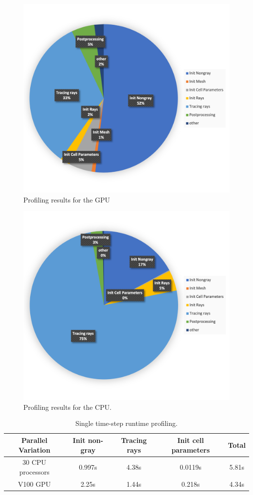 \begin{figure}
\centering
\includegraphics[width=0.675\linewidth]{figures/ch4/PoolFire_profiling_OnetimestepGPU.png}
\caption{Profiling results for the GPU}
\label{fig:PoolFire_profiling}
\end{figure}

\begin{figure}
\centering
\includegraphics[width=0.675\linewidth]{figures/ch4/PoolFire_profiling_OnetimestepCPU.png}
\caption{Profiling results for the CPU.}
\label{fig:PoolFire_profiling_CPU}
\end{figure}

\begin{table}[h!]
\centering
\caption{Single time-step runtime profiling.}
\begin{tabular}{c c c c c} 
 \hline
 Parallel Variation & Init non-gray & Tracing rays & Init cell parameters & Total \\ [0.5ex] 
 \hline
 30 CPU processors & 0.997s & 4.38s & 0.0119s & 5.81s \\
 V100 GPU & 2.25s & 1.44s & 0.218s & 4.34s \\ 
 \hline
\end{tabular}
\label{table:PoolFireTimestep_runtime_table_1rpc}
\end{table}


